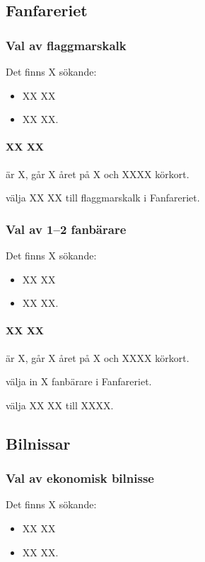 \documentclass[hidelinks]{sektionsmote}
\begin{document}
\subsection{Fanfareriet}
\subsubsection{Val av flaggmarskalk}
Det finns X sökande:
\begin{itemize}
    \item XX XX
    \item XX XX.
\end{itemize}

\paragraph{XX XX} är X, går X året på X och XXXX körkort.

\begin{beslut}
  \item välja XX XX till flaggmarskalk i Fanfareriet.
\end{beslut}


\subsubsection{Val av 1--2 fanbärare}
Det finns X sökande:
\begin{itemize}
    \item XX XX
    \item XX XX.
\end{itemize}

\paragraph{XX XX} är X, går X året på X och XXXX körkort.

\begin{beslut}
  \item välja in X fanbärare i Fanfareriet.
\end{beslut}
\begin{beslut}
  \item välja XX XX till XXXX.
\end{beslut}


\subsection{Bilnissar}
\subsubsection{Val av ekonomisk bilnisse}
Det finns X sökande:
\begin{itemize}
    \item XX XX
    \item XX XX.
\end{itemize}
\end{document}
